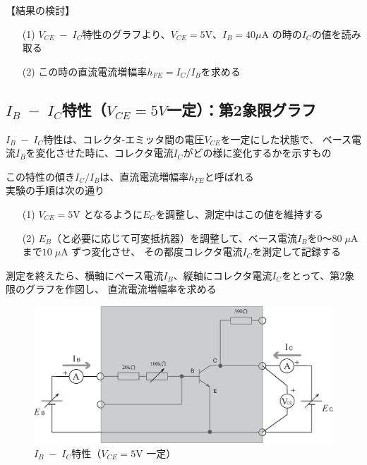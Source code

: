 \documentclass[uplatex,a4paper,11pt,oneside,openany]{jsbook}
\begin{document}
【結果の検討】

\begin{enumerate}
\item[(1)] $V_{CE}\;-\;I_C$特性のグラフより、$V_{CE}=5$V、$I_B=40\mu$A の時の$I_C$の値を読み取る\\
\item[(2)] この時の直流電流増幅率$h_{FE}=I_C/I_B$を求める
\end{enumerate}

\newpage

\subsection{$I_B\;-\;I_C$特性（$V_{CE}=5V$一定）：第2象限グラフ}

$I_B\;-\;I_C$特性は、コレクタ-エミッタ間の電圧$V_{CE}$を一定にした状態で、
ベース電流$I_B$を変化させた時に、コレクタ電流$I_C$がどの様に変化するかを示すもの

この特性の傾き$I_C/I_B$は、直流電流増幅率$h_{FE}$と呼ばれる\\

実験の手順は次の通り

\begin{enumerate}
\item[(1)] $V_{CE}=5$V となるように$E_C$を調整し、測定中はこの値を維持する
\item[(2)] $E_B$（と必要に応じて可変抵抗器）を調整して、ベース電流$I_B$を$0$〜$80\;\mu$A まで$10\;\mu$A ずつ変化させ、
その都度コレクタ電流$I_C$を測定して記録する 
\end{enumerate}

測定を終えたら、横軸にベース電流$I_B$、縦軸にコレクタ電流$I_C$をとって、第2象限のグラフを作図し、
直流電流増幅率を求める

\vfill

\begin{figure}[H]
  \centering
   \includegraphics[keepaspectratio, scale=0.45, angle=0]
               {figs/eps/ex1.eps}
               \caption{$I_B\;-\;I_C$特性（$V_{CE}=5$V 一定）}
               \label{fig:ex2}
\end{figure}
\end{document}
